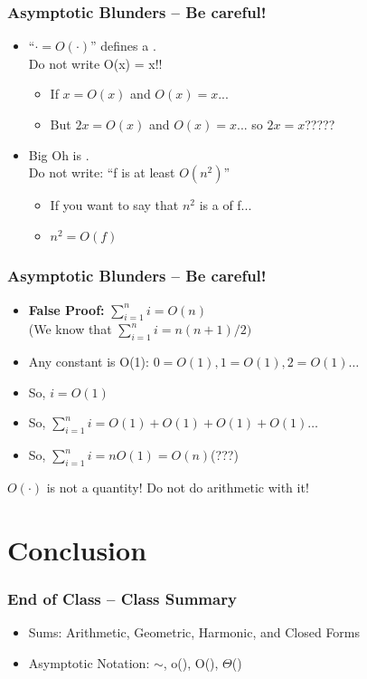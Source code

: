 \documentclass{beamer}
\begin{document}
\begin{frame}
  \frametitle{Asymptotic Blunders -- Be careful!}

  {\larger

    \begin{itemize}
    \item ``$\cdot = O(\cdot)$'' defines a .\\
      \hfill \alert{Do not write O(x) = x!!}
      \begin{itemize}
      \item If $x = O(x)$ and $O(x) = x$...
      \item But $2x = O(x)$ and $O(x) = x$... so $2x = x$?????
      \end{itemize}

      \bigskip

    \item Big Oh is .\\
      \hfill \alert{Do not write: ``f is at least $O(n^2)$''}
      \begin{itemize}
      \item If you want to say that $n^2$ is a  of f...
      \item $n^2 = O(f)$
      \end{itemize}
      
    \end{itemize}
  }  
\end{frame}

\begin{frame}
  \frametitle{Asymptotic Blunders -- Be careful!}

  {\larger
    \begin{itemize}
    \item {\bf False Proof:} $\sum^n_{i=1}i = O(n)$\\
      \hfill(We know that $\sum^n_{i=1}i = n(n+1)/2)$
      \bigskip

    \item Any constant is O(1): $0 = O(1), 1 = O(1), 2 = O(1) \ldots$
    \item So, $i = O(1)$
    \item So, $\sum^n_{i=1}i = O(1) + O(1) + O(1) + O(1) \ldots$
    \item So, $\sum^n_{i=1}i = nO(1) = O(n)$\hfill (???)
    \end{itemize}

    \vfill

    \alert{$O(\cdot)$ is not a quantity! Do not do arithmetic with it!}

  }
\end{frame}


\section{Conclusion}
\begin{frame}
  \frametitle{End of Class -- Class Summary}

  {\larger

    \begin{itemize}
    \item Sums: Arithmetic, Geometric, Harmonic, and Closed Forms

      \bigskip
    \item Asymptotic Notation: $\sim$, o(), O(), $\Theta$()       
    \end{itemize}

  }
\end{frame}
\end{document}
